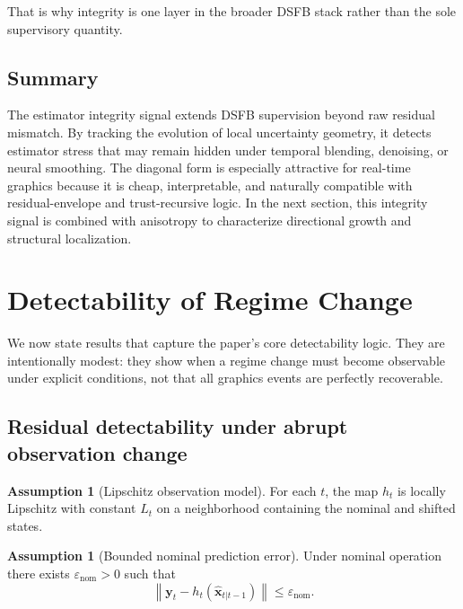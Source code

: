 \documentclass[11pt]{article}
\newcommand{\state}{\mathbf{x}}
\newcommand{\obs}{\mathbf{y}}
\newcommand{\norm}[1]{\left\lVert #1 \right\rVert}
\theoremstyle{definition}
\newtheorem{assumption}[definition]{Assumption}
\theoremstyle{plain}
\begin{document}
That is why integrity is one layer in the broader DSFB stack rather than the sole supervisory quantity.


\subsection{Summary}

The estimator integrity signal extends DSFB supervision beyond raw residual mismatch. By tracking the evolution of local uncertainty geometry, it detects estimator stress that may remain hidden under temporal blending, denoising, or neural smoothing. The diagonal form is especially attractive for real-time graphics because it is cheap, interpretable, and naturally compatible with residual-envelope and trust-recursive logic. In the next section, this integrity signal is combined with anisotropy to characterize directional growth and structural localization.

\section{Detectability of Regime Change}

We now state results that capture the paper's core detectability logic. They are intentionally modest: they show when a regime change must become observable under explicit conditions, not that all graphics events are perfectly recoverable.

\subsection{Residual detectability under abrupt observation change}
\begin{assumption}[Lipschitz observation model]
For each $t$, the map $h_t$ is locally Lipschitz with constant $L_t$ on a neighborhood containing the nominal and shifted states.
\end{assumption}

\begin{assumption}[Bounded nominal prediction error]
Under nominal operation there exists $\varepsilon_{\mathrm{nom}} > 0$ such that
\begin{equation}
    \norm{\obs_t - h_t(\hat{\state}_{t|t-1})} \le \varepsilon_{\mathrm{nom}}.
\end{equation}
\end{assumption}
\end{document}
